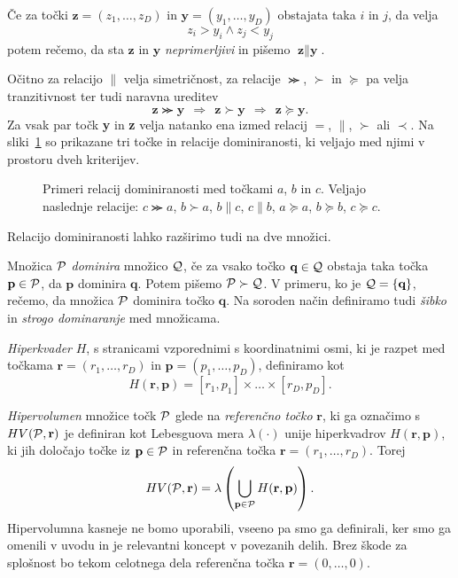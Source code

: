 \begin{definicija}
Če za točki $\textbf{z} = (z_1, \dots, z_D)$ in $\textbf{y} = (y_1, \dots, y_D)$ obstajata taka $i$ in $j$, da velja
\[
z_i > y_i \land z_j < y_j
\]
potem rečemo, da sta $\textbf{z}$ in $\textbf{y}$ \textit{neprimerljivi} in pišemo $\textbf{z} \parallel \textbf{y}$.
\end{definicija}

Očitno za relacijo $\parallel$ velja simetričnost, za relacije $\ggcurly$, $\succ$ in $\succeq$ pa velja tranzitivnost ter tudi naravna ureditev
\[
\textbf{z} \ggcurly \textbf{y}~~\Longrightarrow~~\textbf{z} \succ \textbf{y} ~~\Longrightarrow~~ \textbf{z} \succeq \textbf{y}.
\]
Za vsak par točk \textbf{y} in \textbf{z} velja natanko ena izmed relacij $=$, $\parallel$, $\succ$ ali $\prec$.
Na sliki~\ref{fig:points_domination} so prikazane tri točke in relacije dominiranosti, ki veljajo med njimi v prostoru dveh kriterijev. 
\begin{figure}[ht]
  \centering
  
  \caption{Primeri relacij dominiranosti med točkami $a$, $b$ in $c$. Veljajo naslednje relacije: $c \ggcurly a$, $b \succ a$, $b \parallel c$, $c \parallel b$, $a \succeq a$, $b \succeq b$, $c \succeq c$.}
  \label{fig:points_domination}
\end{figure}

Relacijo dominiranosti lahko razširimo tudi na dve množici.
\begin{definicija}
Množica $\P$ \textit{dominira} množico $\Q$, če za vsako točko $\textbf{q} \in \Q$ obstaja taka točka $\textbf{p} \in \P$, da $\textbf{p}$ dominira $\textbf{q}$. Potem pišemo $\P \succ \Q$. V primeru, ko je $\Q = \{\textbf{q}\}$, rečemo, da množica $\P$ dominira točko $\textbf{q}$. Na soroden način definiramo tudi \textit{šibko} in \textit{strogo dominaranje} med množicama.
\end{definicija}

\begin{definicija}
\textit{Hiperkvader} $H$, s stranicami vzporednimi s koordinatnimi osmi, ki je razpet med točkama $\textbf{r} = (r_1, \dots, r_D)$ in $\textbf{p} = (p_1, \dots, p_D)$, definiramo kot
\[
H(\textbf{r}, \textbf{p}) = [r_1, p_1] \times \dots \times [r_D, p_D].
\]
\end{definicija}


\begin{definicija}
\textit{Hipervolumen} množice točk $\P$ glede na \textit{referenčno točko} $\textbf{r}$, ki ga označimo s $HV(\P, \textbf{r})$ je definiran kot Lebesguova mera $\lambda (\cdot) $ unije hiperkvadrov $H(\textbf{r}, \textbf{p})$, ki jih določajo točke iz $\textbf{p} \in \P$ in referenčna točka $\textbf{r} = (r_1, \dots, r_D)$. Torej
\[
HV(\P, \textbf{r}) = \lambda \left( \bigcup_{\textbf{p} \in \P} H(\textbf{r}, \textbf{p})  \right).
\]
Hipervolumna kasneje ne bomo uporabili, vseeno pa smo ga definirali, ker smo ga omenili v uvodu in je relevantni koncept v povezanih delih. 
Brez škode za splošnost bo tekom celotnega dela referenčna točka $\textbf{r} = (0, \dots, 0)$.
\end{definicija}


